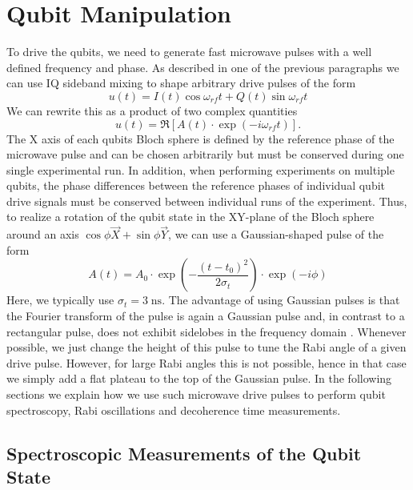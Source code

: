 \section{Qubit Manipulation}

To drive the qubits, we need to generate fast microwave pulses with a well defined frequency and phase. As described in one of the previous paragraphs we can use IQ sideband mixing to shape arbitrary drive pulses of the form
%
\begin{equation}
u(t) = I(t)\cos{\omega_{rf}t}+Q(t)\sin{\omega_{rf}t}
\end{equation}
%
We can rewrite this as a product of two complex quantities
%
\begin{equation}
u(t) = \Re\left[ A(t)\cdot\exp{\left(-i\omega_{rf} t\right)}\right].
\end{equation}
%
The X axis of each qubits Bloch sphere is defined by the reference phase of the microwave pulse and can be chosen arbitrarily but must be conserved during one single experimental run. In addition, when performing experiments on multiple qubits, the phase differences between the reference phases of individual qubit drive signals must be conserved between individual runs of the experiment. Thus, to realize a rotation of the qubit state in the XY-plane of the Bloch sphere around an axis $\cos{\phi}\vec{X}+\sin{\phi}\vec{Y}$, we can use a Gaussian-shaped pulse of the form
%
\begin{equation}
A(t) = A_0\cdot\exp{\left(-\frac{(t-t_0)^2}{2\sigma_t}\right)}\cdot\exp{\left(-i\phi\right)}
\end{equation}
%
Here, we typically use $\sigma_t=3\;\mathrm{ns}$. The advantage of using Gaussian pulses is that the Fourier transform of the pulse is again a Gaussian pulse and, in contrast to a rectangular pulse, does not exhibit sidelobes in the frequency domain \citep{bauer_gaussian_1984}. Whenever possible, we just change the height of this pulse to tune the Rabi angle of a given drive pulse. However, for large Rabi angles this is not possible, hence in that case we simply add a flat plateau to the top of the Gaussian pulse. In the following sections we explain how we use such microwave drive pulses to perform qubit spectroscopy, Rabi oscillations and decoherence time measurements.

\subsection{Spectroscopic Measurements of the Qubit State} \label{section:qubit_spectroscopy}


